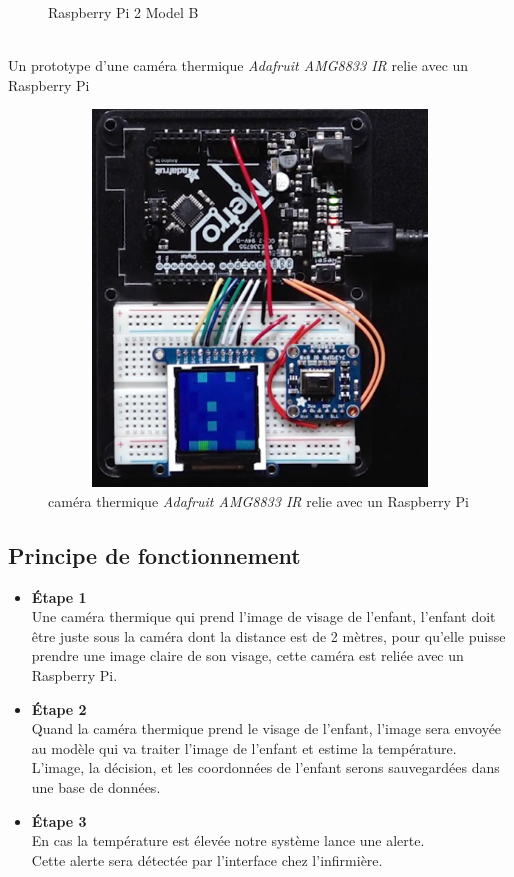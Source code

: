 \documentclass[12pt]{article}
\begin{document}
\begin{itemize}
\begin{figure}[h]
		\caption{Raspberry Pi 2 Model B}
	\end{figure}\\
	
	
	Un prototype d'une caméra thermique \textit{Adafruit AMG8833 IR} relie avec un Raspberry Pi 
	\begin{figure}[h]
				\centering
		\includegraphics[height=10cm,width=12cm]{img-Chapiter-3/therPi.png}
		\caption{caméra thermique \textit{Adafruit AMG8833 IR} relie avec un Raspberry Pi }
	\end{figure}
\end{itemize}
\newpage



\subsection{Principe de fonctionnement}
\begin{itemize}
	\item \textbf{Étape 1}\\
	Une caméra thermique qui prend l'image de visage de l'enfant, l'enfant doit être juste sous la caméra dont la distance est de 2 mètres, pour qu’elle puisse prendre une image claire de son visage, cette caméra est reliée avec un Raspberry Pi.
	\item \textbf{Étape 2}\\
	Quand la caméra thermique prend le visage de l'enfant, l'image sera envoyée  au modèle qui va traiter l'image de l’enfant et estime la température.\\
	L'image, la décision, et les coordonnées de l'enfant serons sauvegardées dans une base de données.
	\item \textbf{Étape 3}\\
	En cas la température est élevée notre système lance une alerte.\\
	Cette alerte sera détectée par l'interface chez l'infirmière. 
\end{itemize}
\newpage
\end{document}
